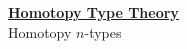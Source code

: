 \documentclass[hott-all.tex]{subfiles}
\begin{document}
\begin{center}
  {\Large{\underline{\textbf{Homotopy Type Theory}}}} \\[2mm]
  {\large Homotopy \texorpdfstring{$n$}{n}-types}
\end{center}

\setcounter{chapter}{7}

% 
% 
% 
% 
% 
% 
% 
\end{document}
